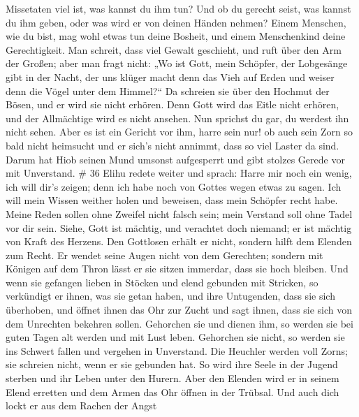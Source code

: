 Missetaten viel ist, was kannst du ihm tun?  Und ob du
gerecht seist, was kannst du ihm geben, oder was wird er von deinen
Händen nehmen?  Einem Menschen, wie du bist, mag wohl etwas
tun deine Bosheit, und einem Menschenkind deine Gerechtigkeit.
 Man schreit, dass viel Gewalt geschieht, und ruft über den
Arm der Großen;  aber man fragt nicht: „Wo ist Gott, mein
Schöpfer, der Lobgesänge gibt in der Nacht,  der uns klüger
macht denn das Vieh auf Erden und weiser denn die Vögel unter dem
Himmel?{}``  Da schreien sie über den Hochmut der Bösen,
und er wird sie nicht erhören.  Denn Gott wird das Eitle
nicht erhören, und der Allmächtige wird es nicht ansehen. 
Nun sprichst du gar, du werdest ihn nicht sehen. Aber es ist ein Gericht
vor ihm, harre sein nur!  ob auch sein Zorn so bald nicht
heimsucht und er sich's nicht annimmt, dass so viel Laster da sind.
 Darum hat Hiob seinen Mund umsonst aufgesperrt und gibt
stolzes Gerede vor mit Unverstand. \# 36  Elihu redete
weiter und sprach:  Harre mir noch ein wenig, ich will dir's
zeigen; denn ich habe noch von Gottes wegen etwas zu sagen. 
Ich will mein Wissen weither holen und beweisen, dass mein Schöpfer
recht habe.  Meine Reden sollen ohne Zweifel nicht falsch
sein; mein Verstand soll ohne Tadel vor dir sein.  Siehe,
Gott ist mächtig, und verachtet doch niemand; er ist mächtig von Kraft
des Herzens.  Den Gottlosen erhält er nicht, sondern hilft
dem Elenden zum Recht.  Er wendet seine Augen nicht von dem
Gerechten; sondern mit Königen auf dem Thron lässt er sie sitzen
immerdar, dass sie hoch bleiben.  Und wenn sie gefangen
lieben in Stöcken und elend gebunden mit Stricken,  so
verkündigt er ihnen, was sie getan haben, und ihre Untugenden, dass sie
sich überhoben,  und öffnet ihnen das Ohr zur Zucht und
sagt ihnen, dass sie sich von dem Unrechten bekehren sollen.
 Gehorchen sie und dienen ihm, so werden sie bei guten
Tagen alt werden und mit Lust leben.  Gehorchen sie nicht,
so werden sie ins Schwert fallen und vergehen in Unverstand.
 Die Heuchler werden voll Zorns; sie schreien nicht, wenn
er sie gebunden hat.  So wird ihre Seele in der Jugend
sterben und ihr Leben unter den Hurern.  Aber den Elenden
wird er in seinem Elend erretten und dem Armen das Ohr öffnen in der
Trübsal.  Und auch dich lockt er aus dem Rachen der Angst

